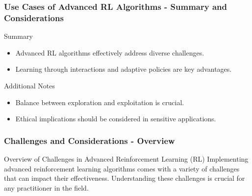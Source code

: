 \documentclass{beamer}
\begin{document}
\begin{frame}[fragile]
    \frametitle{Use Cases of Advanced RL Algorithms - Summary and Considerations}
    \begin{block}{Summary}
        \begin{itemize}
            \item Advanced RL algorithms effectively address diverse challenges.
            \item Learning through interactions and adaptive policies are key advantages.
        \end{itemize}
    \end{block}
    \begin{block}{Additional Notes}
        \begin{itemize}
            \item Balance between exploration and exploitation is crucial.
            \item Ethical implications should be considered in sensitive applications.
        \end{itemize}
    \end{block}
\end{frame}

\begin{frame}[fragile]
    \frametitle{Challenges and Considerations - Overview}
    \begin{block}{Overview of Challenges in Advanced Reinforcement Learning (RL)}
        Implementing advanced reinforcement learning algorithms comes with a variety of challenges that can impact their effectiveness. Understanding these challenges is crucial for any practitioner in the field.
    \end{block}
\end{frame}
\end{document}
